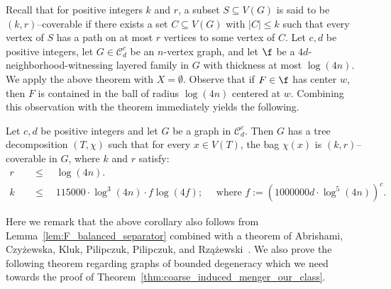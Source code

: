Recall that for positive integers $k$ and $r$, a subset $S \subseteq V(G)$ is said to be $(k,r)$--coverable if there exists a set $C \subseteq V(G)$ with $|C| \le k$ such that every vertex of $S$ has a path on at most $r$ vertices to some vertex of $C$. Let $c,d$ be positive integers, let $G \in \mathcal{C}^c_d$ be an $n$-vertex graph, and let $\f$ be a $4d$-neighborhood-witnessing layered family in $G$ with thickness at most $\log (4n)$. We apply the above theorem with $X = \emptyset$. Observe that if $F \in \f$ has center $w$, then $F$ is contained in the ball of radius $\log (4n)$ centered at $w$. Combining this observation with the theorem immediately yields the following.


\begin{corollary}\label{thm:coarse_treewidth_aux_class}
    Let $c,d$ be positive integers and let $G$ be a graph in $\mathcal{C}^c_d$. Then $G$ has a tree decomposition $(T,\chi)$ such that for every $x\in V(T)$, the bag $\chi(x)$ is $(k, r)$--coverable in $G$, where $k$ and $r$ satisfy:
    \begin{align*}
        r\quad &\leq\quad \log (4n).\\
        k\quad &\leq\quad 115000 \cdot \log^3 (4n) \cdot f \log (4f);\quad \text{ where } f := (1000000d\cdot \log^5 (4n))^{c}.
    \end{align*}    
\end{corollary}


Here we remark that the above corollary also follows from Lemma~\ref{lem:F_balanced_separator} combined with a theorem of Abrishami, Czy\.{z}ewska, Kluk, Pilipczuk, Pilipczuk, and Rz\k{a}\.{z}ewski~\cite{abrishami2025coarsetreedecompositionscoarse}.
% 
% 
We also prove the following theorem regarding graphs of bounded degeneracy which we need towards the proof of Theorem~\ref{thm:coarse_induced_menger_our_class}.

